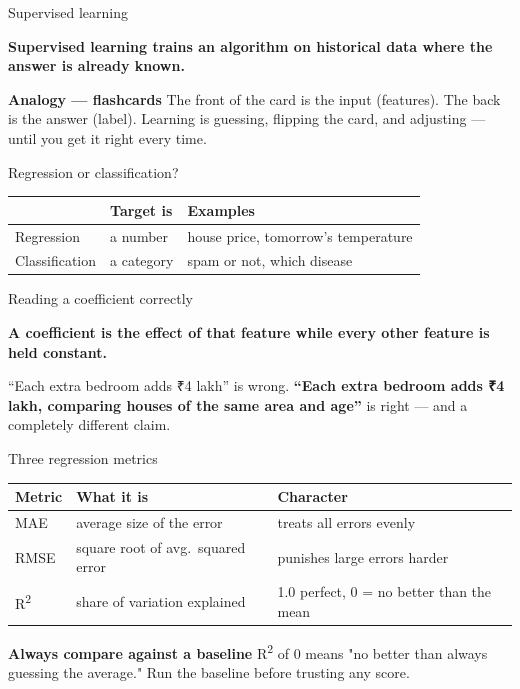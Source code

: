 \documentclass[10pt,aspectratio=169]{beamer}
\newcommand{\keyidea}[1]{%
  \begin{block}{}
  \centering\Large\bfseries\color{dsblue} #1
  \end{block}%
}
\newcommand{\trapbox}[2]{%
  \begin{alertblock}{\textbf{#1}}
  #2
  \end{alertblock}%
}
\newcommand{\analogybox}[2]{%
  \begin{exampleblock}{\textbf{Analogy --- #1}}
  #2
  \end{exampleblock}%
}
\begin{document}
\begin{frame}{Supervised learning}
\keyidea{Supervised learning trains an algorithm on historical data where the answer is already known.}
\analogybox{flashcards}{The front of the card is the input (features). The back is the answer (label). Learning is guessing, flipping the card, and adjusting --- until you get it right every time.}
\end{frame}

\begin{frame}{Regression or classification?}
\begin{table}
\small
\begin{tabularx}{\linewidth}{@{}lXX@{}}
\toprule
& \textbf{Target is} & \textbf{Examples} \\
\midrule
Regression & a number & house price, tomorrow's temperature \\
Classification & a category & spam or not, which disease \\
\bottomrule
\end{tabularx}
\end{table}
\end{frame}

\begin{frame}{Reading a coefficient correctly}
\keyidea{A coefficient is the effect of that feature while every other feature is held constant.}
\vspace{0.3cm}
``Each extra bedroom adds ₹4 lakh'' is wrong. \textbf{``Each extra bedroom adds ₹4 lakh, comparing houses of the same area and age''} is right --- and a completely different claim.
\end{frame}

\begin{frame}{Three regression metrics}
\begin{table}
\small
\begin{tabularx}{\linewidth}{@{}lXl@{}}
\toprule
\textbf{Metric} & \textbf{What it is} & \textbf{Character} \\
\midrule
MAE & average size of the error & treats all errors evenly \\
RMSE & square root of avg.\ squared error & punishes large errors harder \\
R\textsuperscript{2} & share of variation explained & 1.0 perfect, 0 = no better than the mean \\
\bottomrule
\end{tabularx}
\end{table}
\trapbox{Always compare against a baseline}{R\textsuperscript{2} of 0 means "no better than always guessing the average." Run the baseline before trusting any score.}
\end{frame}
\end{document}

